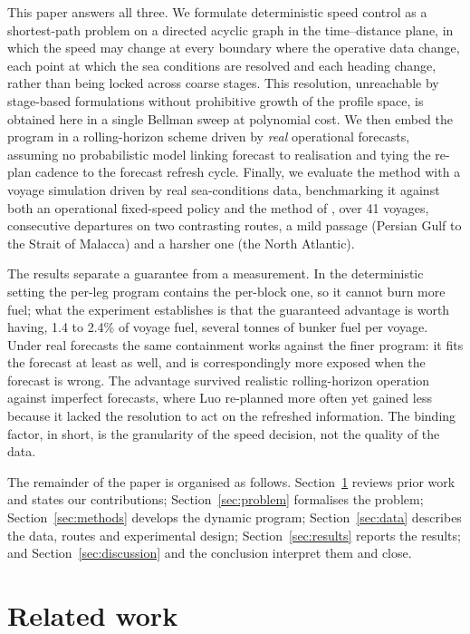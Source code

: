 \documentclass[review,authoryear]{elsarticle}
\begin{document}
This paper answers all three. We formulate deterministic speed control as a shortest-path problem on a
directed acyclic graph in the time--distance plane, in which the speed may change at every boundary
where the operative data change, each point at which the sea conditions are resolved and each heading
change, rather than being locked across coarse stages. This resolution, unreachable by stage-based
formulations without prohibitive growth of the profile space, is obtained here in a single Bellman
sweep at polynomial cost. We then embed the program in a rolling-horizon scheme driven by \emph{real}
operational forecasts, assuming no probabilistic model linking forecast to realisation and tying the
re-plan cadence to the forecast refresh cycle. Finally, we evaluate the method with a voyage simulation
driven by real sea-conditions data, benchmarking it against both an operational fixed-speed policy and
the method of \citet{luo2024}, over 41 voyages, consecutive departures on two contrasting
routes, a mild passage (Persian Gulf to the Strait of Malacca) and a harsher one (the North Atlantic).

The results separate a guarantee from a measurement. In the deterministic setting the per-leg program
contains the per-block one, so it cannot burn more fuel; what the experiment establishes is that the
guaranteed advantage is worth having, 1.4 to 2.4\% of voyage fuel, several tonnes of bunker fuel per
voyage. Under real forecasts the same containment works against the finer program: it fits the
forecast at least as well, and is correspondingly more exposed when the forecast is wrong.
The advantage survived realistic rolling-horizon operation against imperfect forecasts, where
Luo re-planned more often yet gained less because it lacked the resolution to act on
the refreshed information. The binding factor, in short, is the granularity of the speed decision, not
the quality of the data.

The remainder of the paper is organised as follows. Section~\ref{sec:related} reviews prior work and
states our contributions; Section~\ref{sec:problem} formalises the problem; Section~\ref{sec:methods}
develops the dynamic program; Section~\ref{sec:data} describes the data, routes and experimental
design; Section~\ref{sec:results} reports the results; and Section~\ref{sec:discussion} and the
conclusion interpret them and close.

\section{Related work}
\label{sec:related}
\end{document}
